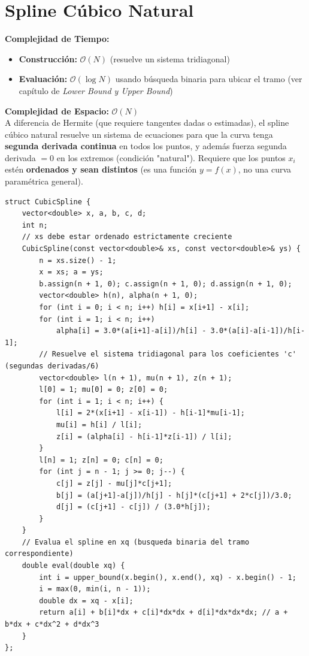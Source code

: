 \documentclass[10pt,twocolumn,letterpaper]{report}
\begin{document}
\section{Spline Cúbico Natural}
\textbf{Complejidad de Tiempo:}
\begin{itemize}
    \item \textbf{Construcción:} $\mathcal{O}(N)$ (resuelve un sistema tridiagonal)
    \item \textbf{Evaluación:} $\mathcal{O}(\log N)$ usando búsqueda binaria para ubicar el tramo (ver capítulo de \textit{Lower Bound y Upper Bound})
\end{itemize}
\textbf{Complejidad de Espacio:} $\mathcal{O}(N)$ \\
A diferencia de Hermite (que requiere tangentes dadas o estimadas), el spline cúbico natural resuelve un sistema de ecuaciones para que la curva tenga \textbf{segunda derivada continua} en todos los puntos, y además fuerza segunda derivada $= 0$ en los extremos (condición "natural"). Requiere que los puntos $x_i$ estén \textbf{ordenados y sean distintos} (es una función $y = f(x)$, no una curva paramétrica general).
\begin{lstlisting}
struct CubicSpline {
    vector<double> x, a, b, c, d;
    int n;
    // xs debe estar ordenado estrictamente creciente
    CubicSpline(const vector<double>& xs, const vector<double>& ys) {
        n = xs.size() - 1;
        x = xs; a = ys;
        b.assign(n + 1, 0); c.assign(n + 1, 0); d.assign(n + 1, 0);
        vector<double> h(n), alpha(n + 1, 0);
        for (int i = 0; i < n; i++) h[i] = x[i+1] - x[i];
        for (int i = 1; i < n; i++)
            alpha[i] = 3.0*(a[i+1]-a[i])/h[i] - 3.0*(a[i]-a[i-1])/h[i-1];
        // Resuelve el sistema tridiagonal para los coeficientes 'c' (segundas derivadas/6)
        vector<double> l(n + 1), mu(n + 1), z(n + 1);
        l[0] = 1; mu[0] = 0; z[0] = 0;
        for (int i = 1; i < n; i++) {
            l[i] = 2*(x[i+1] - x[i-1]) - h[i-1]*mu[i-1];
            mu[i] = h[i] / l[i];
            z[i] = (alpha[i] - h[i-1]*z[i-1]) / l[i];
        }
        l[n] = 1; z[n] = 0; c[n] = 0;
        for (int j = n - 1; j >= 0; j--) {
            c[j] = z[j] - mu[j]*c[j+1];
            b[j] = (a[j+1]-a[j])/h[j] - h[j]*(c[j+1] + 2*c[j])/3.0;
            d[j] = (c[j+1] - c[j]) / (3.0*h[j]);
        }
    }
    // Evalua el spline en xq (busqueda binaria del tramo correspondiente)
    double eval(double xq) {
        int i = upper_bound(x.begin(), x.end(), xq) - x.begin() - 1;
        i = max(0, min(i, n - 1));
        double dx = xq - x[i];
        return a[i] + b[i]*dx + c[i]*dx*dx + d[i]*dx*dx*dx; // a + b*dx + c*dx^2 + d*dx^3
    }
};
\end{lstlisting}
\end{document}
